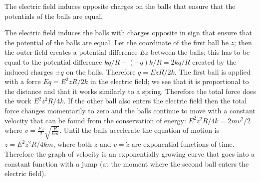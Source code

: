 \hinteng
The electric field induces opposite charges on the balls that ensure that the potentials of the balls are equal.

\solueng
The electric field induces the balls with charges opposite in sign that ensure that the potential of the balls are equal. Let the coordinate of the first ball be $z$; then the outer field creates a potential difference $Ez$ between the balls; this has to be equal to the potential difference $kq/R-(-q)k/R=2kq/R$ created by the induced charges $\pm q$ on the balls. Therefore $q=EzR/2k$. The first ball is applied with a force $Eq=E^2zR/2k$ in the electric field; we see that it is proportional to the distance and that it works similarly to a spring. Therefore the total force does the work $E^2z^2R/4k$. If the other ball also enters the electric field then the total force changes momentarily to zero and the balls continue to move with a constant velocity that can be found from the conservation of energy: $E^2z^2R/4k=2mv^2/2$ where $v=\frac {Ez}{2}\sqrt{\frac{R}{km}}$. Until the balls accelerate the equation of motion is $\ddot z=E^2z^2R/4km$, where both $z$ and $v=\dot z$ are exponential functions of time. Therefore the graph of velocity is an exponentially growing curve that goes into a constant function with a jump (at the moment where the second ball enters the electric field).
\probend